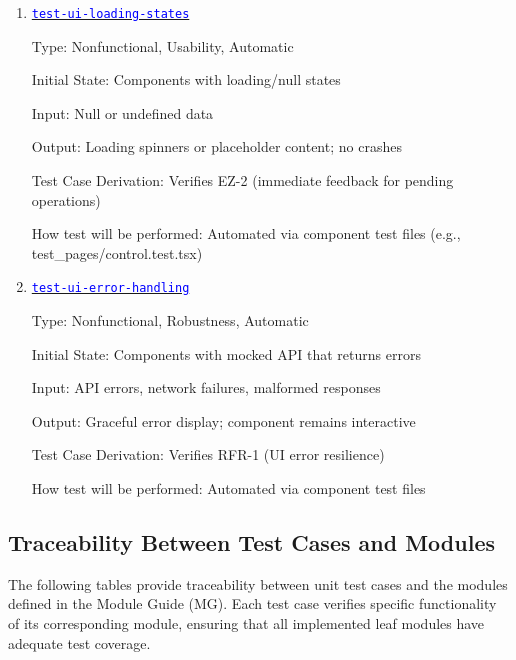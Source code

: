 \documentclass[12pt, titlepage]{article}
\newcommand{\tid}[1]{\hyperlink{tid:#1}{\textcolor{blue}{\texttt{#1}}}}
\begin{document}
\begin{enumerate}

  \item{\tid{test-ui-loading-states}\\}

        Type: Nonfunctional, Usability, Automatic

        Initial State: Components with loading/null states

        Input: Null or undefined data

        Output: Loading spinners or placeholder content; no crashes

        Test Case Derivation: Verifies EZ-2 (immediate feedback for pending operations)

        How test will be performed: Automated via component test files (e.g.,
        test\_pages/control.test.tsx)

  \item{\tid{test-ui-error-handling}\\}

        Type: Nonfunctional, Robustness, Automatic

        Initial State: Components with mocked API that returns errors

        Input: API errors, network failures, malformed responses

        Output: Graceful error display; component remains interactive

        Test Case Derivation: Verifies RFR-1 (UI error resilience)

        How test will be performed: Automated via component test files

\end{enumerate}

\subsection{Traceability Between Test Cases and Modules}

The following tables provide traceability between unit test cases and the
modules defined in the Module Guide (MG). Each test case verifies specific
functionality of its corresponding module, ensuring that all implemented leaf
modules have adequate test coverage.
\end{document}
